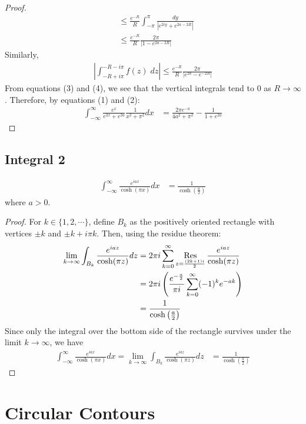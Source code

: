 \begin{proof}
\begin{align*}
&\leq \frac{e^{-R}}{R} \int_{-\pi}^\pi \frac{dy}{|e^{2iy}+e^{2a-2R}|} \\
&\leq \frac{e^{-R}}{R} \frac{2\pi}{|1-e^{2a-2R}|} \tag{3}
\end{align*}Similarly,
\begin{align*}
\left|\int_{-R+i\pi}^{-R-i\pi} f(z)\; dz \right| \leq \frac{e^{-R}}{R}\frac{2\pi}{|e^{2a}-e^{-2R}|}\tag{4}
\end{align*}
From equations (3) and (4), we see that the vertical integrals tend to 0 as $R\to \infty$. Therefore, by equations (1) and (2):
\begin{align*}
\int_{-\infty}^\infty \frac{e^x}{e^{2x}+e^{2a}}\frac{1}{x^2+\pi^2}dx &= \frac{2\pi e^{-a}}{4a^2+\pi^2}-\frac{1}{1+e^{2a}}
\end{align*}
\end{proof}

\subsection{Integral 2}
\begin{align*}
\int_{-\infty}^\infty \frac{e^{ia x}}{\cosh(\pi x)}dx &= \frac{1}{\cosh\left(\frac{a}{2}\right)}
\end{align*}
where $a > 0$.
\begin{proof}
For $k\in \{1,2,\cdots\}$, define $B_k$ as the positively oriented rectangle with vertices $\pm k$ and $\pm k + i\pi k$. Then, using the residue theorem:
\begin{align*}
\lim_{k\to \infty}\int_{B_k}\frac{e^{ia z}}{\cosh(\pi z)}dz &= 2\pi i \sum_{k=0}^\infty \mathop{\text{Res}}\limits_{z=\frac{(2k+1)i}{2}} \frac{e^{ia z}}{\cosh(\pi z)} \\
&= 2\pi i \left(\frac{ e^{- {a\over 2}}}{\pi i}\sum_{k=0}^\infty (-1)^k e^{-ak}\right) \\
&= \frac{1}{\cosh\left(\frac{a}{2}\right)}
\end{align*}
Since only the integral over the bottom side of the rectangle survives under the limit $k\to \infty$, we have
\begin{align*}
\int_{-\infty}^\infty \frac{e^{ia x}}{\cosh(\pi x)}dx =\lim_{k\to \infty}\int_{B_k}\frac{e^{ia z}}{\cosh(\pi z)}dz &= \frac{1}{\cosh\left(\frac{a}{2}\right)}
\end{align*}
\end{proof}
\section{Circular Contours}
